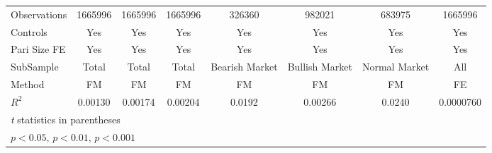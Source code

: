 {\begin{tabular}{l*{7}{c}}
\hline
Observations    &  1665996         &  1665996         &  1665996         &   326360         &   982021         &   683975         &  1665996         \\
Controls        &      Yes         &      Yes         &      Yes         &      Yes         &      Yes         &      Yes         &      Yes         \\
Pari Size FE    &      Yes         &      Yes         &      Yes         &      Yes         &      Yes         &      Yes         &      Yes         \\
SubSample       &    Total         &    Total         &    Total         &Bearish Market         &Bullish Market         &Normal Market         &      All         \\
Method          &       FM         &       FM         &       FM         &       FM         &       FM         &       FM         &       FE         \\
$ R^2$          &  0.00130         &  0.00174         &  0.00204         &   0.0192         &  0.00266         &   0.0240         &0.0000760         \\
\hline\hline
\multicolumn{8}{l}{\footnotesize \textit{t} statistics in parentheses}\\
\multicolumn{8}{l}{\footnotesize \sym{*} \(p<0.05\), \sym{**} \(p<0.01\), \sym{***} \(p<0.001\)}\\
\end{tabular}
}
